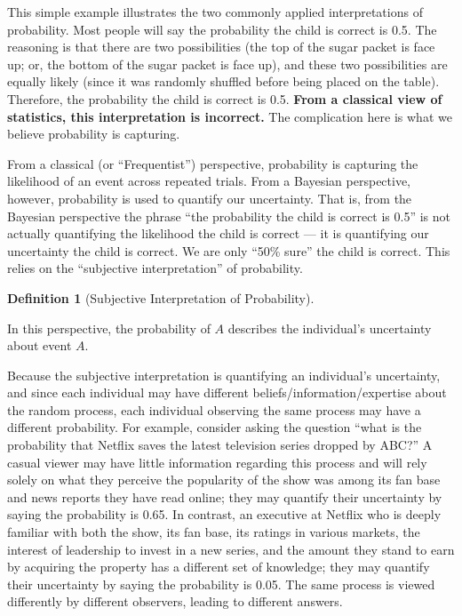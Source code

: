 \documentclass[
  letterpaper,
  DIV=11,
  numbers=noendperiod]{scrreprt}
\theoremstyle{definition}
\theoremstyle{definition}
\newtheorem{definition}{Definition}[chapter]
\theoremstyle{plain}
\theoremstyle{remark}
\begin{document}
This simple example illustrates the two commonly applied interpretations
of probability. Most people will say the probability the child is
correct is 0.5. The reasoning is that there are two possibilities (the
top of the sugar packet is face up; or, the bottom of the sugar packet
is face up), and these two possibilities are equally likely (since it
was randomly shuffled before being placed on the table). Therefore, the
probability the child is correct is 0.5. \textbf{From a classical view
of statistics, this interpretation is incorrect.} The complication here
is what we believe probability is capturing.

From a classical (or ``Frequentist'') perspective, probability is
capturing the likelihood of an event across repeated trials. From a
Bayesian perspective, however, probability is used to quantify our
uncertainty. That is, from the Bayesian perspective the phrase ``the
probability the child is correct is 0.5'' is not actually quantifying
the likelihood the child is correct --- it is quantifying our
uncertainty the child is correct. We are only ``50\% sure'' the child is
correct. This relies on the ``subjective interpretation'' of
probability.

\begin{definition}[Subjective Interpretation of
Probability]\protect\hypertarget{def-subjective-interpretation}{}\label{def-subjective-interpretation}

In this perspective, the probability of \(A\) describes the individual's
uncertainty about event \(A\).

\end{definition}

Because the subjective interpretation is quantifying an individual's
uncertainty, and since each individual may have different
beliefs/information/expertise about the random process, each individual
observing the same process may have a different probability. For
example, consider asking the question ``what is the probability that
Netflix saves the latest television series dropped by ABC?'' A casual
viewer may have little information regarding this process and will rely
solely on what they perceive the popularity of the show was among its
fan base and news reports they have read online; they may quantify their
uncertainty by saying the probability is 0.65. In contrast, an executive
at Netflix who is deeply familiar with both the show, its fan base, its
ratings in various markets, the interest of leadership to invest in a
new series, and the amount they stand to earn by acquiring the property
has a different set of knowledge; they may quantify their uncertainty by
saying the probability is 0.05. The same process is viewed differently
by different observers, leading to different answers.
\end{document}
